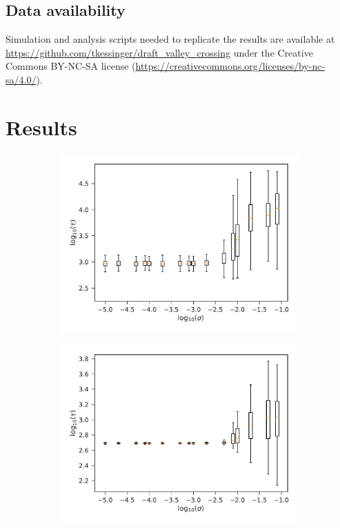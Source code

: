 \documentclass[rmp]{revtex4}
\begin{document}
\begin{spacing}{1.5}
\subsection*{Data availability}

Simulation and analysis scripts needed to replicate the results are available at \url{https://github.com/tkessinger/draft_valley_crossing} under the Creative Commons BY-NC-SA license (\url{https://creativecommons.org/licenses/by-nc-sa/4.0/}).

\section{Results}

\begin{figure}[t]
\begin{subfigure}[b]{0.4\textwidth}
\includegraphics[width=\textwidth]{Figures/det_tunnel.pdf}
\end{subfigure}
\begin{subfigure}[b]{0.4\textwidth}
\includegraphics[width=\textwidth]{Figures/det_fix.pdf}

\end{subfigure}
\end{figure}
\end{spacing}
\end{document}
